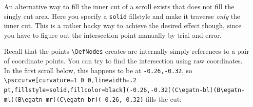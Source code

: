\documentclass[a4paper,justified]{tufte-handout}
\begin{document}
\noindent An alternative way to fill the inner cut of a scroll exists that does not fill the singly cut area. Here you specify a \texttt{solid} fillstyle and make it traverse \textit{only} the inner cut. This is a rather hacky way to achieve the desired effect though, since you have to figure out the intersection point manually by trial and error.

Recall that the points \verb|\DefNodes| creates are internally simply references to a pair of coordinate points. You can try to find the intersection using raw coordinates. In the first scroll below, this happens to be at \texttt{-0.26,-0.32}, so \verb|\psccurve[curvature=1 0 0,linewidth=.2| \verb|pt,fillstyle=solid,fillcolor=black](-0.26,-0.32)(C\egatn-bl)|\break \verb|(B\egatn-ml)(B\egatn-mr)(C\egatn-br)(-0.26,-0.32)| fills the cut:\bigskip
\end{document}
